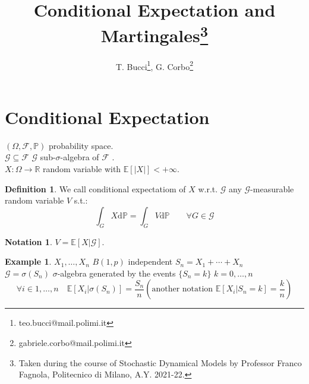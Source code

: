 \documentclass[10pt,a4paper]{article}
\title{Conditional Expectation and Martingales\footnote{Taken during the course of Stochastic Dynamical Models by Professor Franco Fagnola, Politecnico di Milano, A.Y. 2021-22.}}
\author{T. Bucci\footnote{teo.bucci@mail.polimi.it}, G. Corbo\footnote{gabriele.corbo@mail.polimi.it}}
\theoremstyle{definition}
\newtheorem{defi}{Definition}[section]
\newtheorem*{notat}{Notation}
\newtheorem{exi}{Example}[section]
\begin{document}
\maketitle
	\section{Conditional Expectation}
		$(\Omega,\mathcal{F},\mathbb{P})$  probability space. \\
		$\mathcal{G}\subseteq\mathcal{F}$           $ \mathcal{G}$ sub-$\sigma$-algebra of  $\mathcal{F} $ .\\
		$ X:\Omega\to\mathbb{R} $ random variable with $ \mathbb{E}[|X|]<+\infty .$
		\begin{defi}
			We call conditional expectatiom of $X$ w.r.t. $\mathcal{G}$ any $\mathcal{G}$-measurable random variable $ V $ s.t.:
			\begin{equation}
				\int_{G}X\mathrm{d}\mathbb{P} = \int_{G}V\mathrm{d}\mathbb{P}  \qquad    \forall G \in \mathcal{G}
			\end{equation}
		\end{defi}
		\begin{notat}
			$V=\mathbb{E}[X|\mathcal{G}]$.
		\end{notat}
	\begin{exi}
		$X_1,\ldots,X_n$  $ B(1,p) $ independent   $ S_n= X_1+\cdots+X_n$ \\
		$\mathcal{G}=\sigma(S_n)$ $\sigma$-algebra generated by the events $ \{S_n=k\}$   $ k=0,\ldots,n$ 
		\begin{equation*}
			\forall i\in {1,\ldots,n}  \quad  \mathbb{E}[X_i|\sigma(S_n)]=\frac{S_n}{n}  \left(\text{another notation } \mathbb{E}[X_i|S_n=k]=\frac{k}{n}\right) 
		\end{equation*}
	\end{exi}
\end{document}
